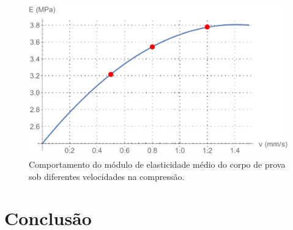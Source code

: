 \documentclass[a4paper, 12pt]{article}
\begin{document}
	\begin{figure}[h!]
		\centering
		\includegraphics[width=0.7\linewidth]{sections/images/g4}
		\caption{Comportamento do módulo de elasticidade médio do corpo de prova sob diferentes velocidades na compressão.}
		\label{fig:g4}
	\end{figure}
	
	\section{Conclusão}
\end{document}
